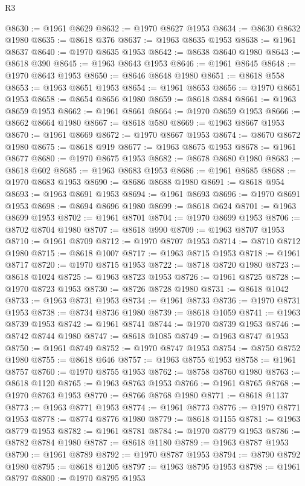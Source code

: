 \begin{lexlean}{R3}
\begin{coremodule}
@8630 := @1961 @8629
@8632 := @1970 @8627 @1953
@8634 := @8630 @8632 @1980
@8635 := @8618 @376
@8637 := @1963 @8635 @1953
@8638 := @1961 @8637
@8640 := @1970 @8635 @1953
@8642 := @8638 @8640 @1980
@8643 := @8618 @390
@8645 := @1963 @8643 @1953
@8646 := @1961 @8645
@8648 := @1970 @8643 @1953
@8650 := @8646 @8648 @1980
@8651 := @8618 @558
@8653 := @1963 @8651 @1953
@8654 := @1961 @8653
@8656 := @1970 @8651 @1953
@8658 := @8654 @8656 @1980
@8659 := @8618 @884
@8661 := @1963 @8659 @1953
@8662 := @1961 @8661
@8664 := @1970 @8659 @1953
@8666 := @8662 @8664 @1980
@8667 := @8618 @580
@8669 := @1963 @8667 @1953
@8670 := @1961 @8669
@8672 := @1970 @8667 @1953
@8674 := @8670 @8672 @1980
@8675 := @8618 @919
@8677 := @1963 @8675 @1953
@8678 := @1961 @8677
@8680 := @1970 @8675 @1953
@8682 := @8678 @8680 @1980
@8683 := @8618 @602
@8685 := @1963 @8683 @1953
@8686 := @1961 @8685
@8688 := @1970 @8683 @1953
@8690 := @8686 @8688 @1980
@8691 := @8618 @954
@8693 := @1963 @8691 @1953
@8694 := @1961 @8693
@8696 := @1970 @8691 @1953
@8698 := @8694 @8696 @1980
@8699 := @8618 @624
@8701 := @1963 @8699 @1953
@8702 := @1961 @8701
@8704 := @1970 @8699 @1953
@8706 := @8702 @8704 @1980
@8707 := @8618 @990
@8709 := @1963 @8707 @1953
@8710 := @1961 @8709
@8712 := @1970 @8707 @1953
@8714 := @8710 @8712 @1980
@8715 := @8618 @1007
@8717 := @1963 @8715 @1953
@8718 := @1961 @8717
@8720 := @1970 @8715 @1953
@8722 := @8718 @8720 @1980
@8723 := @8618 @1024
@8725 := @1963 @8723 @1953
@8726 := @1961 @8725
@8728 := @1970 @8723 @1953
@8730 := @8726 @8728 @1980
@8731 := @8618 @1042
@8733 := @1963 @8731 @1953
@8734 := @1961 @8733
@8736 := @1970 @8731 @1953
@8738 := @8734 @8736 @1980
@8739 := @8618 @1059
@8741 := @1963 @8739 @1953
@8742 := @1961 @8741
@8744 := @1970 @8739 @1953
@8746 := @8742 @8744 @1980
@8747 := @8618 @1085
@8749 := @1963 @8747 @1953
@8750 := @1961 @8749
@8752 := @1970 @8747 @1953
@8754 := @8750 @8752 @1980
@8755 := @8618 @646
@8757 := @1963 @8755 @1953
@8758 := @1961 @8757
@8760 := @1970 @8755 @1953
@8762 := @8758 @8760 @1980
@8763 := @8618 @1120
@8765 := @1963 @8763 @1953
@8766 := @1961 @8765
@8768 := @1970 @8763 @1953
@8770 := @8766 @8768 @1980
@8771 := @8618 @1137
@8773 := @1963 @8771 @1953
@8774 := @1961 @8773
@8776 := @1970 @8771 @1953
@8778 := @8774 @8776 @1980
@8779 := @8618 @1155
@8781 := @1963 @8779 @1953
@8782 := @1961 @8781
@8784 := @1970 @8779 @1953
@8786 := @8782 @8784 @1980
@8787 := @8618 @1180
@8789 := @1963 @8787 @1953
@8790 := @1961 @8789
@8792 := @1970 @8787 @1953
@8794 := @8790 @8792 @1980
@8795 := @8618 @1205
@8797 := @1963 @8795 @1953
@8798 := @1961 @8797
@8800 := @1970 @8795 @1953

\end{coremodule}
\end{lexlean}
